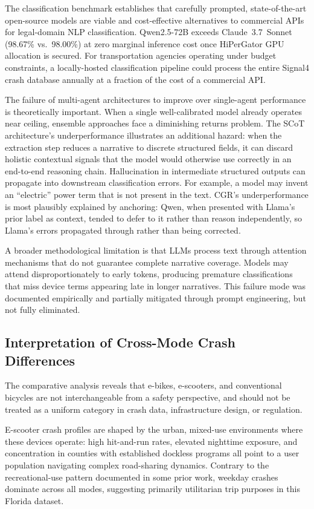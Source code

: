 \documentclass[numbered]{trbunofficial}
\begin{document}
The classification benchmark establishes that carefully prompted, state-of-the-art open-source models are viable and cost-effective alternatives to commercial APIs for legal-domain NLP classification. Qwen2.5-72B exceeds Claude~3.7~Sonnet (98.67\% vs.\ 98.00\%) at zero marginal inference cost once HiPerGator GPU allocation is secured. For transportation agencies operating under budget constraints, a locally-hosted classification pipeline could process the entire Signal4 crash database annually at a fraction of the cost of a commercial API.

The failure of multi-agent architectures to improve over single-agent performance is theoretically important. When a single well-calibrated model already operates near ceiling, ensemble approaches face a diminishing returns problem. The SCoT architecture's underperformance illustrates an additional hazard: when the extraction step reduces a narrative to discrete structured fields, it can discard holistic contextual signals that the model would otherwise use correctly in an end-to-end reasoning chain. Hallucination in intermediate structured outputs can propagate into downstream classification errors. For example, a model may invent an ``electric'' power term that is not present in the text. CGR's underperformance is most plausibly explained by anchoring: Qwen, when presented with Llama's prior label as context, tended to defer to it rather than reason independently, so Llama's errors propagated through rather than being corrected.

A broader methodological limitation is that LLMs process text through attention mechanisms that do not guarantee complete narrative coverage. Models may attend disproportionately to early tokens, producing premature classifications that miss device terms appearing late in longer narratives. This failure mode was documented empirically and partially mitigated through prompt engineering, but not fully eliminated.

\subsection{Interpretation of Cross-Mode Crash Differences}

The comparative analysis reveals that e-bikes, e-scooters, and conventional bicycles are not interchangeable from a safety perspective, and should not be treated as a uniform category in crash data, infrastructure design, or regulation.

E-scooter crash profiles are shaped by the urban, mixed-use environments where these devices operate: high hit-and-run rates, elevated nighttime exposure, and concentration in counties with established dockless programs all point to a user population navigating complex road-sharing dynamics. Contrary to the recreational-use pattern documented in some prior work, weekday crashes dominate across all modes, suggesting primarily utilitarian trip purposes in this Florida dataset.
\end{document}
